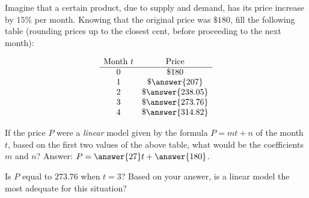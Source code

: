 \documentclass{ximera}
\author{Ivo Terek}
\begin{document}
\begin{exercise}
  Imagine that a certain product, due to supply and demand, has its price increase by $15\%$ per month. Knowing that the original price was $\$180$, fill the following table (rounding prices up to the closest cent, before proceeding to the next month):

  $$
\begin{array}{cc}
\text{Month } t& \text{Price}\\
\hline
0 & \${180}\\
1& \$\answer{207}\\
2&\$\answer{238.05}\\
3&\$\answer{273.76}\\
4&\$\answer{314.82}
\end{array}
$$

\begin{exercise}
  If the price $P$ were a \emph{linear} model given by the formula $P = mt+n$ of the month $t$, based on the first two values of the above table, what would be the coefficients $m$ and $n$? Answer: $P = \answer{27}t+\answer{180}$.

  \begin{exercise}
    Is $P$ equal to $273.76$ when $t=3$? Based on your answer, is a linear model the most adequate for this situation?
    \begin{multipleChoice}
    \end{multipleChoice}
  \end{exercise}
  
\end{exercise}

\end{exercise}
\end{document}
